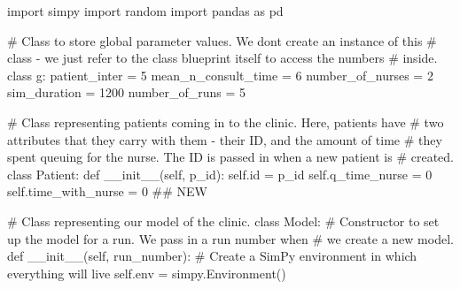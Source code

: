 \documentclass[
  letterpaper,
  DIV=11,
  numbers=noendperiod]{scrreprt}
\newenvironment{Shaded}{}{}
\newcommand{\BuiltInTok}[1]{\textcolor[rgb]{0.84,0.23,0.29}{#1}}
\newcommand{\CommentTok}[1]{\textcolor[rgb]{0.42,0.45,0.49}{#1}}
\newcommand{\DecValTok}[1]{\textcolor[rgb]{0.00,0.36,0.77}{#1}}
\newcommand{\FunctionTok}[1]{\textcolor[rgb]{0.44,0.26,0.76}{#1}}
\newcommand{\ImportTok}[1]{\textcolor[rgb]{0.01,0.18,0.38}{#1}}
\newcommand{\KeywordTok}[1]{\textcolor[rgb]{0.84,0.23,0.29}{#1}}
\newcommand{\NormalTok}[1]{\textcolor[rgb]{0.14,0.16,0.18}{#1}}
\newcommand{\OperatorTok}[1]{\textcolor[rgb]{0.14,0.16,0.18}{#1}}
\newcommand{\VariableTok}[1]{\textcolor[rgb]{0.89,0.38,0.04}{#1}}
\begin{document}
\begin{tcolorbox}[enhanced jigsaw, colframe=quarto-callout-note-color-frame, bottomtitle=1mm, breakable, rightrule=.15mm, coltitle=black, colbacktitle=quarto-callout-note-color!10!white, opacityback=0, leftrule=.75mm, arc=.35mm, toptitle=1mm, title=\textcolor{quarto-callout-note-color}{\faInfo}\hspace{0.5em}{Click here to view the full code}, titlerule=0mm, colback=white, toprule=.15mm, bottomrule=.15mm, left=2mm, opacitybacktitle=0.6]

\begin{Shaded}
\begin{Highlighting}[]
\ImportTok{import}\NormalTok{ simpy}
\ImportTok{import}\NormalTok{ random}
\ImportTok{import}\NormalTok{ pandas }\ImportTok{as}\NormalTok{ pd}

\CommentTok{\# Class to store global parameter values.  We don\textquotesingle{}t create an instance of this}
\CommentTok{\# class {-} we just refer to the class blueprint itself to access the numbers}
\CommentTok{\# inside.}
\KeywordTok{class}\NormalTok{ g:}
\NormalTok{    patient\_inter }\OperatorTok{=} \DecValTok{5}
\NormalTok{    mean\_n\_consult\_time }\OperatorTok{=} \DecValTok{6}
\NormalTok{    number\_of\_nurses }\OperatorTok{=} \DecValTok{2}
\NormalTok{    sim\_duration }\OperatorTok{=} \DecValTok{1200}
\NormalTok{    number\_of\_runs }\OperatorTok{=} \DecValTok{5}

\CommentTok{\# Class representing patients coming in to the clinic.  Here, patients have}
\CommentTok{\# two attributes that they carry with them {-} their ID, and the amount of time}
\CommentTok{\# they spent queuing for the nurse.  The ID is passed in when a new patient is}
\CommentTok{\# created.}
\KeywordTok{class}\NormalTok{ Patient:}
    \KeywordTok{def} \FunctionTok{\_\_init\_\_}\NormalTok{(}\VariableTok{self}\NormalTok{, p\_id):}
        \VariableTok{self}\NormalTok{.}\BuiltInTok{id} \OperatorTok{=}\NormalTok{ p\_id}
        \VariableTok{self}\NormalTok{.q\_time\_nurse }\OperatorTok{=} \DecValTok{0}
        \VariableTok{self}\NormalTok{.time\_with\_nurse }\OperatorTok{=} \DecValTok{0} \CommentTok{\#\# NEW}

\CommentTok{\# Class representing our model of the clinic.}
\KeywordTok{class}\NormalTok{ Model:}
    \CommentTok{\# Constructor to set up the model for a run.  We pass in a run number when}
    \CommentTok{\# we create a new model.}
    \KeywordTok{def} \FunctionTok{\_\_init\_\_}\NormalTok{(}\VariableTok{self}\NormalTok{, run\_number):}
        \CommentTok{\# Create a SimPy environment in which everything will live}
        \VariableTok{self}\NormalTok{.env }\OperatorTok{=}\NormalTok{ simpy.Environment()}


\end{Highlighting}
\end{Shaded}
\end{tcolorbox}
\end{document}
